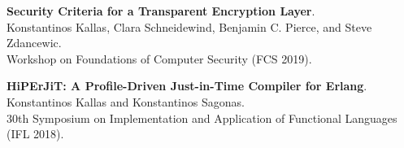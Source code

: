 \begin{minipage}{\textwidth}
\textbf{Security Criteria for a Transparent Encryption Layer}. \\
Konstantinos Kallas, Clara Schneidewind, Benjamin C. Pierce, and Steve Zdancewic. \\
Workshop on Foundations of Computer Security (FCS 2019).
\end{minipage}

\begin{minipage}{\textwidth}
\textbf{HiPErJiT: A Profile-Driven Just-in-Time Compiler for Erlang}. \\
Konstantinos Kallas and Konstantinos Sagonas. \\
30th Symposium on Implementation and Application of Functional Languages (IFL 2018).
\end{minipage}


